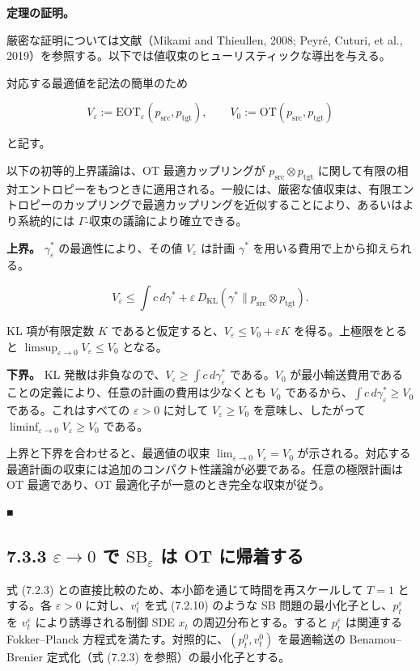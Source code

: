 \textbf{定理の証明。}

厳密な証明については文献（Mikami and Thieullen, 2008; Peyré, Cuturi, et al., 2019）を参照する。以下では値収束のヒューリスティックな導出を与える。

対応する最適値を記法の簡単のため

\[
V_\varepsilon:=\mathrm{EOT}_\varepsilon(p_{\mathrm{src}},p_{\mathrm{tgt}}),\qquad
V_0:=\mathrm{OT}(p_{\mathrm{src}},p_{\mathrm{tgt}})
\]


と記す。

以下の初等的上界議論は、OT 最適カップリングが $p_{\mathrm{src}}\otimes p_{\mathrm{tgt}}$ に関して有限の相対エントロピーをもつときに適用される。一般には、厳密な値収束は、有限エントロピーのカップリングで最適カップリングを近似することにより、あるいはより系統的には $\Gamma$-収束の議論により確立できる。

\textbf{上界。} $\gamma_\varepsilon^*$ の最適性により、その値 $V_\varepsilon$ は計画 $\gamma^*$ を用いる費用で上から抑えられる。

\[
V_\varepsilon\le\int c\,d\gamma^*+\varepsilon\,D_{\mathrm{KL}}(\gamma^*\|p_{\mathrm{src}}\otimes p_{\mathrm{tgt}}).
\]


KL 項が有限定数 $K$ であると仮定すると、$V_\varepsilon\le V_0+\varepsilon K$ を得る。上極限をとると $\limsup_{\varepsilon\to 0}V_\varepsilon\le V_0$ となる。

\textbf{下界。} KL 発散は非負なので、$V_\varepsilon\ge\int c\,d\gamma_\varepsilon^*$ である。$V_0$ が最小輸送費用であることの定義により、任意の計画の費用は少なくとも $V_0$ であるから、$\int c\,d\gamma_\varepsilon^*\ge V_0$ である。これはすべての $\varepsilon>0$ に対して $V_\varepsilon\ge V_0$ を意味し、したがって $\liminf_{\varepsilon\to 0}V_\varepsilon\ge V_0$ である。

上界と下界を合わせると、最適値の収束 $\lim_{\varepsilon\to 0}V_\varepsilon=V_0$ が示される。対応する最適計画の収束には追加のコンパクト性議論が必要である。任意の極限計画は OT 最適であり、OT 最適化子が一意のとき完全な収束が従う。

■

\subsection*{7.3.3 $\varepsilon\to 0$ で $\mathrm{SB}_\varepsilon$ は OT に帰着する}


式 (7.2.3) との直接比較のため、本小節を通じて時間を再スケールして $T=1$ とする。各 $\varepsilon>0$ に対し、$v_t^\varepsilon$ を式 (7.2.10) のような SB 問題の最小化子とし、$p_t^\varepsilon$ を $v_t^\varepsilon$ により誘導される制御 SDE $x_t$ の周辺分布とする。すると $p_t^\varepsilon$ は関連する Fokker–Planck 方程式を満たす。対照的に、$(p_t^0,v_t^0)$ を最適輸送の Benamou–Brenier 定式化（式 (7.2.3) を参照）の最小化子とする。

